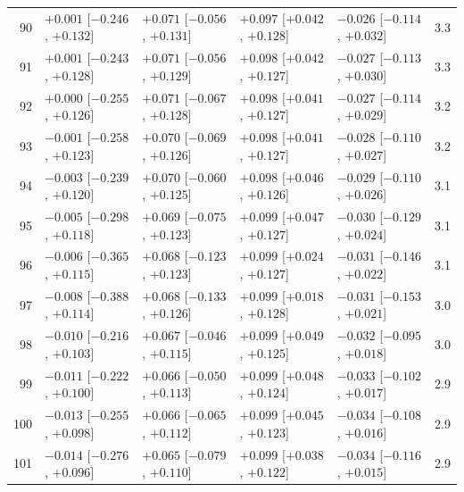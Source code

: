 \begin{longtable}{rllllr}
90 & $+0.001$ {\scriptsize [$-0.246$, $+0.132$]} & $+0.071$ {\scriptsize [$-0.056$, $+0.131$]} & $+0.097$ {\scriptsize [$+0.042$, $+0.128$]} & $-0.026$ {\scriptsize [$-0.114$, $+0.032$]} & 3.3 \\
91 & $+0.001$ {\scriptsize [$-0.243$, $+0.128$]} & $+0.071$ {\scriptsize [$-0.056$, $+0.129$]} & $+0.098$ {\scriptsize [$+0.042$, $+0.127$]} & $-0.027$ {\scriptsize [$-0.113$, $+0.030$]} & 3.3 \\
92 & $+0.000$ {\scriptsize [$-0.255$, $+0.126$]} & $+0.071$ {\scriptsize [$-0.067$, $+0.128$]} & $+0.098$ {\scriptsize [$+0.041$, $+0.127$]} & $-0.027$ {\scriptsize [$-0.114$, $+0.029$]} & 3.2 \\
93 & $-0.001$ {\scriptsize [$-0.258$, $+0.123$]} & $+0.070$ {\scriptsize [$-0.069$, $+0.126$]} & $+0.098$ {\scriptsize [$+0.041$, $+0.127$]} & $-0.028$ {\scriptsize [$-0.110$, $+0.027$]} & 3.2 \\
94 & $-0.003$ {\scriptsize [$-0.239$, $+0.120$]} & $+0.070$ {\scriptsize [$-0.060$, $+0.125$]} & $+0.098$ {\scriptsize [$+0.046$, $+0.126$]} & $-0.029$ {\scriptsize [$-0.110$, $+0.026$]} & 3.1 \\
95 & $-0.005$ {\scriptsize [$-0.298$, $+0.118$]} & $+0.069$ {\scriptsize [$-0.075$, $+0.123$]} & $+0.099$ {\scriptsize [$+0.047$, $+0.127$]} & $-0.030$ {\scriptsize [$-0.129$, $+0.024$]} & 3.1 \\
96 & $-0.006$ {\scriptsize [$-0.365$, $+0.115$]} & $+0.068$ {\scriptsize [$-0.123$, $+0.123$]} & $+0.099$ {\scriptsize [$+0.024$, $+0.127$]} & $-0.031$ {\scriptsize [$-0.146$, $+0.022$]} & 3.1 \\
97 & $-0.008$ {\scriptsize [$-0.388$, $+0.114$]} & $+0.068$ {\scriptsize [$-0.133$, $+0.126$]} & $+0.099$ {\scriptsize [$+0.018$, $+0.128$]} & $-0.031$ {\scriptsize [$-0.153$, $+0.021$]} & 3.0 \\
98 & $-0.010$ {\scriptsize [$-0.216$, $+0.103$]} & $+0.067$ {\scriptsize [$-0.046$, $+0.115$]} & $+0.099$ {\scriptsize [$+0.049$, $+0.125$]} & $-0.032$ {\scriptsize [$-0.095$, $+0.018$]} & 3.0 \\
99 & $-0.011$ {\scriptsize [$-0.222$, $+0.100$]} & $+0.066$ {\scriptsize [$-0.050$, $+0.113$]} & $+0.099$ {\scriptsize [$+0.048$, $+0.124$]} & $-0.033$ {\scriptsize [$-0.102$, $+0.017$]} & 2.9 \\
100 & $-0.013$ {\scriptsize [$-0.255$, $+0.098$]} & $+0.066$ {\scriptsize [$-0.065$, $+0.112$]} & $+0.099$ {\scriptsize [$+0.045$, $+0.123$]} & $-0.034$ {\scriptsize [$-0.108$, $+0.016$]} & 2.9 \\
101 & $-0.014$ {\scriptsize [$-0.276$, $+0.096$]} & $+0.065$ {\scriptsize [$-0.079$, $+0.110$]} & $+0.099$ {\scriptsize [$+0.038$, $+0.122$]} & $-0.034$ {\scriptsize [$-0.116$, $+0.015$]} & 2.9 \\

\end{longtable}
